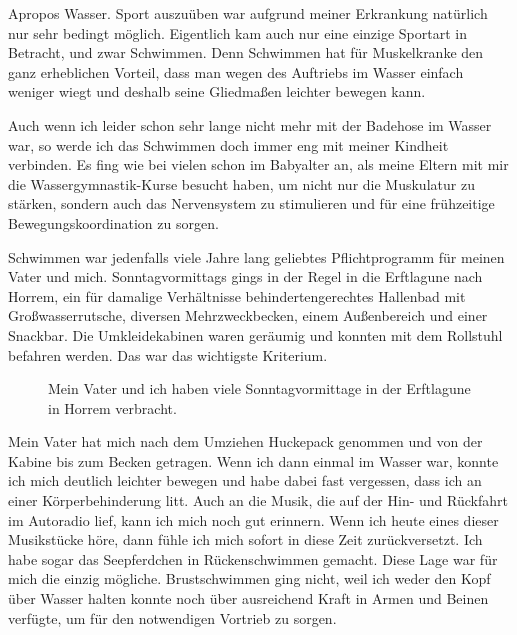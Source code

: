 \documentclass[fontsize=14pt,a4paper,headinclude,DIV=calc,automark]{scrbook}
\begin{document}
Apropos Wasser. Sport auszuüben war aufgrund meiner Erkrankung natürlich nur sehr bedingt möglich. Eigentlich kam auch nur eine einzige Sportart in Betracht, und zwar Schwimmen. Denn Schwimmen hat für Muskelkranke den ganz erheblichen Vorteil, dass man wegen des Auftriebs im Wasser einfach weniger wiegt und deshalb seine Gliedmaßen leichter bewegen kann.

Auch wenn ich leider schon sehr lange nicht mehr mit der Badehose im Wasser war, so werde ich das Schwimmen doch immer eng mit meiner Kindheit verbinden. Es fing wie bei vielen schon im Babyalter an, als meine Eltern mit mir die Wassergymnastik-Kurse besucht haben, um nicht nur die Muskulatur zu stärken, sondern auch das Nervensystem zu stimulieren und für eine frühzeitige Bewegungskoordination zu sorgen.

Schwimmen war jedenfalls viele Jahre lang geliebtes Pflichtprogramm für meinen Vater und mich. Sonntagvormittags gings in der Regel in die Erftlagune nach Horrem, ein für damalige Verhältnisse behindertengerechtes Hallenbad mit Großwasserrutsche, diversen Mehrzweckbecken, einem Außenbereich und einer Snackbar. Die Umkleidekabinen waren geräumig und konnten mit dem Rollstuhl befahren werden. Das war das wichtigste Kriterium.

\setlength{\fboxsep}{0pt}    %
\setlength{\fboxrule}{0.2pt} %
\begin{figure}[H]
    \raggedright
    \caption{Mein Vater und ich haben viele Sonntagvormittage in der Erftlagune in Horrem verbracht.}
    \label{fig:erftlagune}
\end{figure}

Mein Vater hat mich nach dem Umziehen Huckepack genommen und von der Kabine bis zum Becken getragen. Wenn ich dann einmal im Wasser war, konnte ich mich deutlich leichter bewegen und habe dabei fast vergessen, dass ich an einer Körperbehinderung litt. Auch an die Musik, die auf der Hin- und Rückfahrt im Autoradio lief, kann ich mich noch gut erinnern. Wenn ich heute eines dieser Musikstücke höre, dann fühle ich mich sofort in diese Zeit zurückversetzt. Ich habe sogar das Seepferdchen in Rückenschwimmen gemacht. Diese Lage war für mich die einzig mögliche. Brustschwimmen ging nicht, weil ich weder den Kopf über Wasser halten konnte noch über ausreichend Kraft in Armen und Beinen verfügte, um für den notwendigen Vortrieb zu sorgen.
\end{document}
